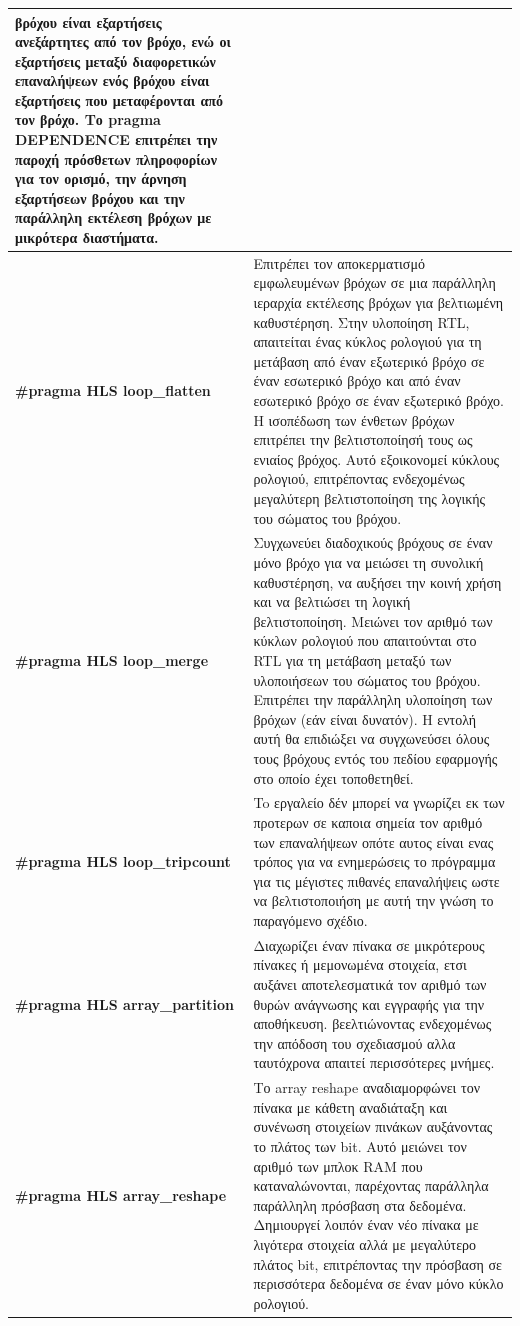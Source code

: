\begin{longtable}{|p{4cm}|p{10cm}|}
  βρόχου είναι εξαρτήσεις ανεξάρτητες από τον βρόχο, ενώ οι εξαρτήσεις μεταξύ διαφορετικών επαναλήψεων ενός βρόχου είναι εξαρτήσεις που μεταφέρονται από τον βρόχο.
  Το pragma DEPENDENCE επιτρέπει την παροχή πρόσθετων πληροφορίων για τον ορισμό, την άρνηση εξαρτήσεων βρόχου και την παράλληλη εκτέλεση βρόχων με μικρότερα διαστήματα.\\
  \hline
  \textbf{\#pragma HLS loop\_flatten} & Επιτρέπει τον αποκερματισμό εμφωλευμένων βρόχων σε μια παράλληλη ιεραρχία εκτέλεσης βρόχων για βελτιωμένη καθυστέρηση.
  Στην υλοποίηση RTL, απαιτείται ένας κύκλος ρολογιού για τη μετάβαση από έναν εξωτερικό βρόχο σε έναν εσωτερικό βρόχο και από έναν εσωτερικό βρόχο σε έναν εξωτερικό βρόχο.
  Η ισοπέδωση των ένθετων βρόχων επιτρέπει την βελτιστοποίησή τους ως ενιαίος βρόχος. Αυτό εξοικονομεί κύκλους ρολογιού, επιτρέποντας ενδεχομένως μεγαλύτερη βελτιστοποίηση της λογικής του σώματος του βρόχου.\\
  \hline
  \textbf{\#pragma HLS loop\_merge} & Συγχωνεύει διαδοχικούς βρόχους σε έναν μόνο βρόχο για να μειώσει τη συνολική καθυστέρηση, να αυξήσει την κοινή χρήση και να βελτιώσει τη λογική βελτιστοποίηση.
  Μειώνει τον αριθμό των κύκλων ρολογιού που απαιτούνται στο RTL για τη μετάβαση μεταξύ των υλοποιήσεων του σώματος του βρόχου. Επιτρέπει την παράλληλη υλοποίηση των βρόχων (εάν είναι δυνατόν).
  Η εντολή αυτή θα επιδιώξει να συγχωνεύσει όλους τους βρόχους εντός του πεδίου εφαρμογής στο οποίο έχει τοποθετηθεί.\\
  \hline
  \textbf{\#pragma HLS loop\_tripcount} & To εργαλείο δέν μπορεί να γνωρίζει εκ των προτερων σε καποια σημεία τον αριθμό των επαναλήψεων οπότε αυτος είναι ενας τρόπος για να ενημερώσεις το πρόγραμμα
  για τις μέγιστες πιθανές επαναλήψεις ωστε να βελτιστοποιήση με αυτή την γνώση το παραγόμενο σχέδιο.\\
  \hline
  \textbf{\#pragma HLS array\_partition} & Διαχωρίζει έναν πίνακα σε μικρότερους πίνακες ή μεμονωμένα στοιχεία, ετσι αυξάνει αποτελεσματικά τον αριθμό των θυρών ανάγνωσης και εγγραφής για την αποθήκευση.
  βεελτιώνοντας ενδεχομένως την απόδοση του σχεδιασμού αλλα ταυτόχρονα απαιτεί περισσότερες μνήμες. \\
  \hline
  \textbf{\#pragma HLS array\_reshape} & Το array reshape αναδιαμορφώνει τον πίνακα με κάθετη αναδιάταξη και συνένωση στοιχείων πινάκων αυξάνοντας το πλάτος των bit.
  Αυτό μειώνει τον αριθμό των μπλοκ RAM που καταναλώνονται, παρέχοντας παράλληλα παράλληλη πρόσβαση στα δεδομένα. Δημιουργεί λοιπόν έναν νέο πίνακα με λιγότερα στοιχεία
  αλλά με μεγαλύτερο πλάτος bit, επιτρέποντας την πρόσβαση σε περισσότερα δεδομένα σε έναν μόνο κύκλο ρολογιού. \\

\end{longtable}

